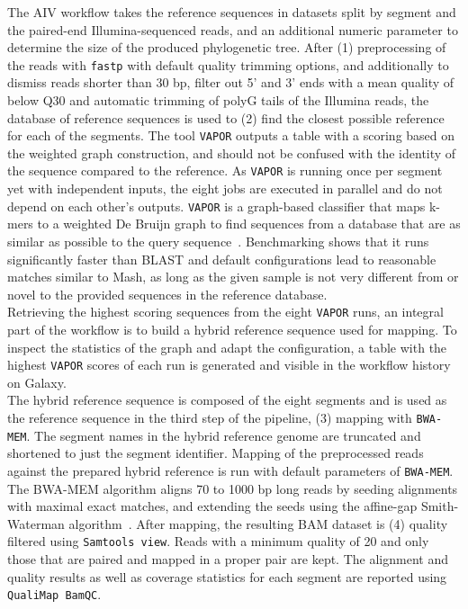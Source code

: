 The \ac{AIV} workflow takes the reference sequences in datasets split by segment and the paired-end Illumina-sequenced reads, and an additional numeric parameter to determine the size of the produced phylogenetic tree. After (1) preprocessing of the reads with \texttt{fastp} with default quality trimming options, and additionally to dismiss reads shorter than 30 bp, filter out 5' and 3' ends with a mean quality of below Q30 and automatic trimming of polyG tails of the Illumina reads, the database of reference sequences is used to (2) find the closest possible reference for each of the segments. The tool \texttt{VAPOR} outputs a table with a scoring based on the weighted graph construction, and should not be confused with the identity of the sequence compared to the reference. As \texttt{VAPOR} is running once per segment yet with independent inputs, the eight jobs are executed in parallel and do not depend on each other's outputs. \texttt{VAPOR} is a graph-based classifier that maps k-mers to a weighted De Bruijn graph to find sequences from a database that are as similar as possible to the query sequence~\cite{southgate2020influenza}. Benchmarking shows that it runs significantly faster than \ac{BLAST} and default configurations lead to reasonable matches similar to Mash, as long as the given sample is not very different from or novel to the provided sequences in the reference database. \\
Retrieving the highest scoring sequences from the eight \texttt{VAPOR} runs, an integral part of the workflow is to build a hybrid reference sequence used for mapping. To inspect the statistics of the graph and adapt the configuration, a table with the highest \texttt{VAPOR} scores of each run is generated and visible in the workflow history on Galaxy. \\
The hybrid reference sequence is composed of the eight segments and is used as the reference sequence in the third step of the pipeline, (3) mapping with \texttt{BWA-MEM}. The segment names in the hybrid reference genome are truncated and shortened to just the segment identifier. Mapping of the preprocessed reads against the prepared hybrid reference is run with default parameters of \texttt{BWA-MEM}. The \ac{BWA-MEM} algorithm aligns 70 to 1000 bp long reads by seeding alignments with maximal exact matches, and extending the seeds using the affine-gap Smith-Waterman algorithm~\cite{li2013aligning}. After mapping, the resulting \ac{BAM} dataset is (4) quality filtered using \texttt{Samtools view}. Reads with a minimum quality of 20 and only those that are paired and mapped in a proper pair are kept. The alignment and quality results as well as coverage statistics for each segment are reported using \texttt{QualiMap BamQC}. \\

